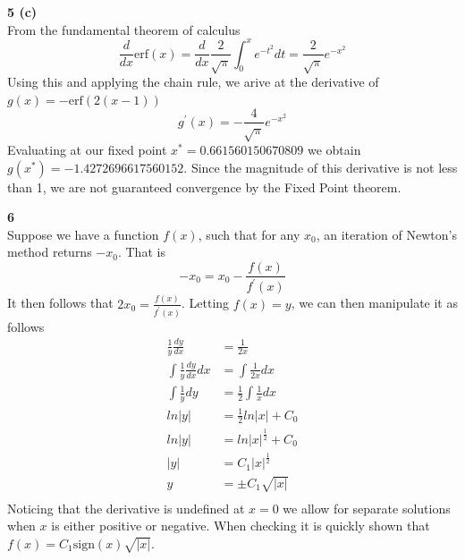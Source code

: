 \documentclass[12pt]{article}
\newcommand{\problem}[1]{\hspace{-4 ex} \large \textbf{#1}\\}
\begin{document}
\problem{5 (c)}
	From the fundamental theorem of calculus 
	$$
	\frac{d}{dx}\text{erf}(x) = \frac{d}{dx}\frac{2}{\sqrt{\pi}}\int_0^x e^{-t^2}dt = \frac{2}{\sqrt{\pi}} e^{-x^2}
	$$
	Using this and applying the chain rule, we arive at the derivative of $g(x) = -\text{erf}(2(x-1))$ \\
	$$
	g^\prime(x) = -\frac{4}{\sqrt{\pi}} e^{-x^2}
	$$
	Evaluating at our fixed point $x^* = 0.661560150670809$ we obtain $g(x^*) = -1.4272696617560152$. Since the magnitude of this derivative is not less than 1, we are not guaranteed convergence by the Fixed Point theorem.
	
	
\problem{6} 
	Suppose we have a function $f(x)$, such that for any $x_0$, an iteration of Newton's method returns $-x_0$. That is 
	$$
	-x_0 = x_0 - \frac{f(x)}{f^\prime(x)}
	$$
	It then follows that $2x_0 = \frac{f(x)}{f^\prime(x)}$. Letting $f(x)=y$, we can then manipulate it as follows
	\begin{align*}
		\frac{1}{y}\frac{dy}{dx} & = \frac{1}{2x} \\
		\int \frac{1}{y}\frac{dy}{dx} dx & = \int \frac{1}{2x} dx \\
		\int \frac{1}{y}dy & = \frac{1}{2}\int \frac{1}{x} dx \\
		ln\vert y \vert & = \frac{1}{2} ln\vert x \vert + C_0 \\
		ln\vert y \vert & = ln\vert x \vert^\frac{1}{2} + C_0 \\
		\vert y \vert & = C_1 \vert x \vert^\frac{1}{2} \\
		y & = \pm C_1 \sqrt{\vert x \vert} \\
	\end{align*}
	Noticing that the derivative is undefined at $x=0$ we allow for separate solutions when $x$ is either positive or negative. When checking it is quickly shown that $f(x)=C_1 \text{sign}(x)\sqrt{\vert x \vert}$.
\end{document}
